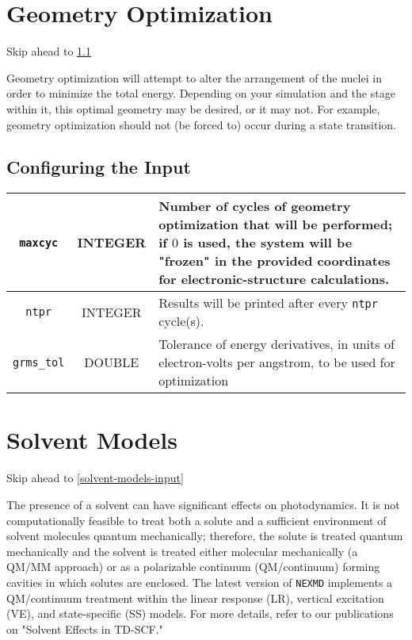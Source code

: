 \documentclass[12pt,letter,footinclude=true,headinclude=true,hyphens,oneside]{book} %
\begin{document}
    \section{Geometry Optimization}
    
    Skip ahead to \ref{geo-opt-input}
    
    Geometry optimization will attempt to alter the arrangement of the nuclei in order to minimize the total energy. Depending on your simulation and the stage within it, this optimal geometry may be desired, or it may not.  For example, geometry optimization should not (be forced to) occur during a state transition.
    
    \subsection{Configuring the Input}
    \label{geo-opt-input}
    
    \begin{tabular}{ | c | c | p{7cm} | }
    \hline
    \texttt{maxcyc} & INTEGER & Number of cycles of geometry optimization that will be performed; if $0$ is used, the system will be "frozen" in the provided coordinates for electronic-structure calculations. \\ \hline
    \texttt{ntpr} & INTEGER & Results will be printed after every \texttt{ntpr} cycle(s). \\ \hline
    \texttt{grms\_tol} & DOUBLE & Tolerance of energy derivatives, in units of electron-volts per angstrom, to be used for optimization \\
    \hline
    \end{tabular}
    
    \section{Solvent Models}

    Skip ahead to \ref{solvent-models-input}
    
    The presence of a solvent can have significant effects on photodynamics. It is not computationally feasible to treat both a solute and a sufficient environment of solvent molecules quantum mechanically; therefore, the solute is treated quantum mechanically and the solvent is treated either molecular mechanically (a QM/MM approach) or as a polarizable continuum (QM/continuum) forming cavities in which solutes are enclosed. The latest version of \texttt{NEXMD} implements a QM/continuum treatment within the linear response (LR), vertical excitation (VE), and state-specific (SS) models. For more details, refer to our publications on "Solvent Effects in TD-SCF."
    
\end{document}
